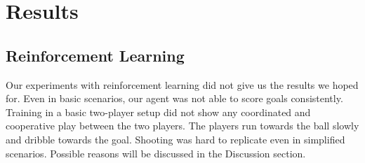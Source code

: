 \section{Results}
\label{section:results}

\subsection{Reinforcement Learning}
Our experiments with reinforcement learning did not give us the results we hoped for.  
Even in basic scenarios, our agent was not able to score goals consistently.  
Training in a basic two-player setup did not show any coordinated and cooperative play between the two players.  
The players run towards the ball slowly and dribble towards the goal.  
Shooting was hard to replicate even in simplified scenarios.  
Possible reasons will be discussed in the Discussion section.
